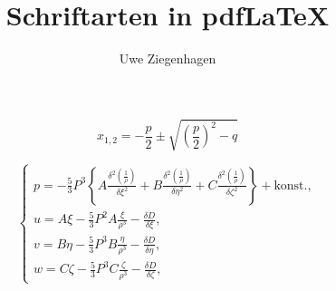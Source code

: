 \documentclass[12pt,ngerman,parskip=half]{scrartcl}
\title{Schriftarten in pdf\LaTeX}
\author{Uwe Ziegenhagen}
\begin{document}
\maketitle


\blindtext

\begin{equation}
x_{1,2} = -\frac{p}{2} \pm \sqrt{  \left( \frac{p}{2} \right) ^2 - q  }
\end{equation}


\blindtext

\begin{equation}
\left\{
\begin{array}{l}
p = - \frac{5}{3} P^3 \left\{A \frac{\delta^2 \left(\frac{1}{\rho} \right)}{\delta \xi^2} + B  \frac{\delta^2 \left(\frac{1}{\rho} \right)}{\delta \eta^2} + C \frac{\delta^2 \left(\frac{1}{\rho} \right)}{\delta \zeta^2} \right\} + \text{konst.}, \\
u = A \xi - \frac{5}{3} P^2 A \frac{\xi}{\rho^3} - \frac{\delta D}{\delta \xi}, \\
v = B \eta - \frac{5}{3} P^3 B \frac{\eta}{\rho^3} - \frac{\delta D}{\delta \eta}, \\
w = C \zeta - \frac{5}{3} P^3 C \frac{\zeta}{\rho^3} - \frac{\delta D}{\delta \zeta},
\end{array}
\right.
\end{equation}


\blindtext

\blindtext
\end{document}
